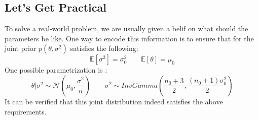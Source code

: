 \subsection*{Let's Get Practical}
To solve a real-world problem, we are usually given a belif on what should the parameters be like. One way to encode this information is to ensure that for the joint prior $p(\theta, \sigma^2)$ satisfies the following:
\begin{equation*}
    \mathbb{E}[\sigma^2] = \sigma_0^2 \qquad \mathbb{E}[\theta] = \mu_0
\end{equation*}
One possible parametrization is :
\begin{equation*}
    \theta | \sigma^2 \sim \mathcal{N}(\mu_0, \frac{\sigma^2}{n}) \qquad \sigma^2 \sim InvGamma(\frac{n_0 + 3}{2}, \frac{(n_0 + 1)\sigma_0^2}{2})
\end{equation*}
It can be verified that this joint distribution indeed satisfies the above requirements.